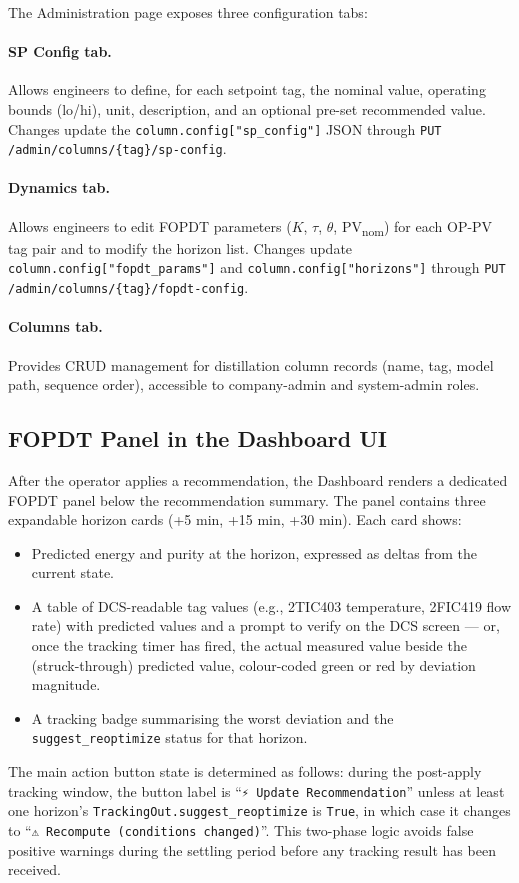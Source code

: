 The Administration page exposes three configuration tabs:

\paragraph{SP Config tab.} Allows engineers to define, for each setpoint
tag, the nominal value, operating bounds (lo/hi), unit, description, and
an optional pre-set recommended value.  Changes update the
\texttt{column.config["sp\_config"]} JSON through
\texttt{PUT /admin/columns/\{tag\}/sp-config}.

\paragraph{Dynamics tab.} Allows engineers to edit FOPDT parameters ($K$,
$\tau$, $\theta$, PV\textsubscript{nom}) for each OP-PV tag pair and
to modify the horizon list.  Changes update
\texttt{column.config["fopdt\_params"]} and \texttt{column.config["horizons"]}
through \texttt{PUT /admin/columns/\{tag\}/fopdt-config}.

\paragraph{Columns tab.} Provides CRUD management for distillation column
records (name, tag, model path, sequence order), accessible to
company-admin and system-admin roles.

\subsection{FOPDT Panel in the Dashboard UI}

After the operator applies a recommendation, the Dashboard renders a
dedicated FOPDT panel below the recommendation summary.  The panel contains
three expandable horizon cards (+5 min, +15 min, +30 min).  Each card shows:

\begin{itemize}
  \item Predicted energy and purity at the horizon, expressed as deltas
        from the current state.
  \item A table of DCS-readable tag values (e.g., 2TIC403 temperature,
        2FIC419 flow rate) with predicted values and a prompt to verify
        on the DCS screen — or, once the tracking timer has fired, the
        actual measured value beside the (struck-through) predicted value,
        colour-coded green or red by deviation magnitude.
  \item A tracking badge summarising the worst deviation and the
        \texttt{suggest\_reoptimize} status for that horizon.
\end{itemize}

The main action button state is determined as follows: during the post-apply
tracking window, the button label is ``\texttt{⚡ Update Recommendation}''
unless at least one horizon's \texttt{TrackingOut.suggest\_reoptimize} is
\texttt{True}, in which case it changes to
``\texttt{⚠ Recompute (conditions changed)}''.  This two-phase logic avoids
false positive warnings during the settling period before any tracking result
has been received.
